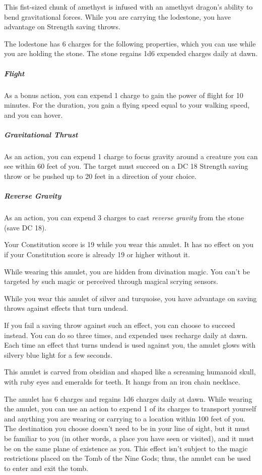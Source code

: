 \documentclass[10pt,a4paper,twoside,bg=print,twocolumn,openany,nodeprecatedcode]{dndbook}
\begin{document}
This fist-sized chunk of amethyst is infused with an amethyst dragon's ability to bend gravitational forces. While you are carrying the lodestone, you have advantage on Strength saving throws.

The lodestone has 6 charges for the following properties, which you can use while you are holding the stone. The stone regains 1d6 expended charges daily at dawn.

\subparagraph{Flight}
As a bonus action, you can expend 1 charge to gain the power of flight for 10 minutes. For the duration, you gain a flying speed equal to your walking speed, and you can hover.

\subparagraph{Gravitational Thrust}
As an action, you can expend 1 charge to focus gravity around a creature you can see within 60 feet of you. The target must succeed on a DC 18 Strength saving throw or be pushed up to 20 feet in a direction of your choice.

\subparagraph{Reverse Gravity}
As an action, you can expend 3 charges to cast \textit{reverse gravity} from the stone (save DC 18).

Your Constitution score is 19 while you wear this amulet. It has no effect on you if your Constitution score is already 19 or higher without it.

While wearing this amulet, you are hidden from divination magic. You can't be targeted by such magic or perceived through magical scrying sensors.

While you wear this amulet of silver and turquoise, you have advantage on saving throws against effects that turn undead.

If you fail a saving throw against such an effect, you can choose to succeed instead. You can do so three times, and expended uses recharge daily at dawn. Each time an effect that turns undead is used against you, the amulet glows with silvery blue light for a few seconds.

This amulet is carved from obsidian and shaped like a screaming humanoid skull, with ruby eyes and emeralds for teeth. It hangs from an iron chain necklace.

The amulet has 6 charges and regains 1d6 charges daily at dawn. While wearing the amulet, you can use an action to expend 1 of its charges to transport yourself and anything you are wearing or carrying to a location within 100 feet of you. The destination you choose doesn't need to be in your line of sight, but it must be familiar to you (in other words, a place you have seen or visited), and it must be on the same plane of existence as you. This effect isn't subject to the magic restrictions placed on the Tomb of the Nine Gods; thus, the amulet can be used to enter and exit the tomb.
\end{document}
